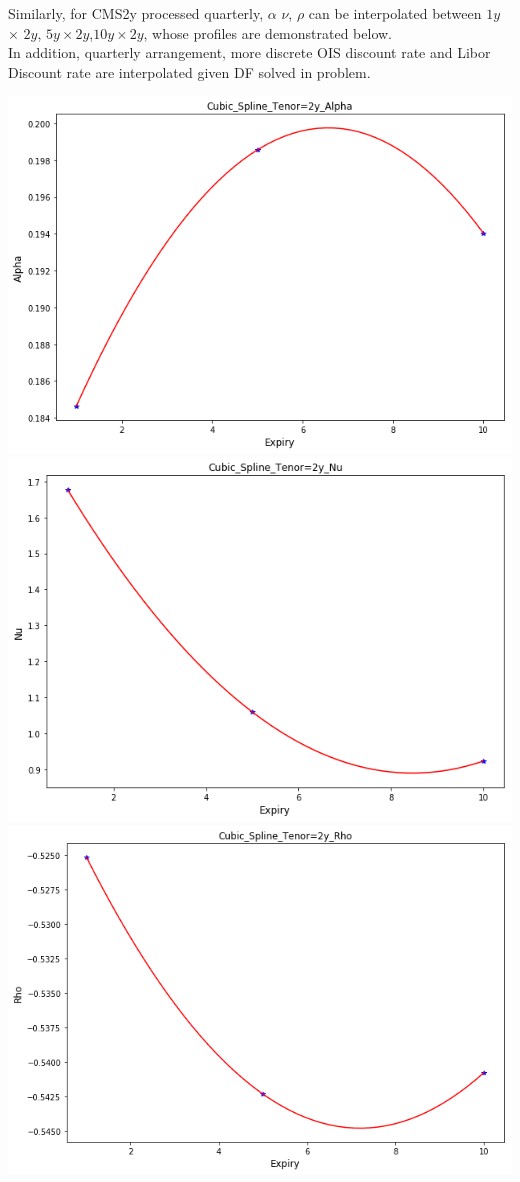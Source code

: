 \documentclass{article}
\begin{document}
Similarly, for CMS2y processed quarterly, $\alpha$ $\nu$, $\rho$ can be interpolated between $1y$ $\times$ $2y$, $5y\times2y$,$10y\times2y$, whose profiles are demonstrated below.\\ In addition, quarterly arrangement, more discrete OIS discount rate and Libor Discount rate are interpolated given DF solved in problem.

\includegraphics[scale=0.4]{./images/Alpha_2y}\\
\includegraphics[scale=0.4]{./images/Nu_2y}\\
\includegraphics[scale=0.4]{./images/Rho_2y}\\
\end{document}
